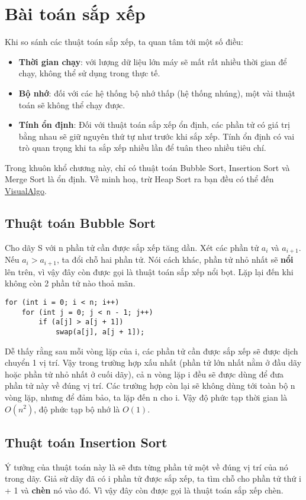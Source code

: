 \chapter{Bài toán sắp xếp}
Khi so sánh các thuật toán sắp xếp, ta quan tâm tới một số điều:
\begin{itemize}
    \item \textbf{Thời gian chạy}: với lượng dữ liệu lớn máy sẽ mất rất nhiều thời gian để chạy, không thể sử dụng trong thực tế.
    \item \textbf{Bộ nhớ}: đối với các hệ thống bộ nhớ thấp (hệ thống nhúng), một vài thuật toán sẽ không thể chạy được.
    \item \textbf{Tính ổn định}: Đối với thuật toán sắp xếp ổn định, các phần tử có giá trị bằng nhau sẽ giữ nguyên thứ tự như trước khi sắp xếp. Tính ổn định có vai trò quan trọng khi ta sắp xếp nhiều lần để tuân theo nhiều tiêu chí.
\end{itemize}
Trong khuôn khổ chương này, chỉ có thuật toán Bubble Sort, Insertion Sort và Merge Sort là ổn định. Về minh hoạ, trừ Heap Sort ra bạn đều có thể đến \href{https://visualgo.net/en/sorting}{VisualAlgo}.

\section{Thuật toán Bubble Sort}
Cho dãy S với n phần tử cần được sắp xếp tăng dần. Xét các phần tử $a_i$ và $a_{i+1}$. Nếu $a_i>a_{i+1}$, ta đổi chỗ hai phần tử. Nói cách khác, phần tử nhỏ nhất sẽ \textbf{nổi} lên trên, vì vậy đây còn được gọi là thuật toán sắp xếp nổi bọt. Lặp lại đến khi không còn 2 phần tử nào thoả mãn.

\begin{verbatim}
for (int i = 0; i < n; i++)
    for (int j = 0; j < n - 1; j++)
        if (a[j] > a[j + 1])
            swap(a[j], a[j + 1]);
\end{verbatim}

Dễ thấy rằng sau mỗi vòng lặp của i, các phần tử cần được sắp xếp sẽ được dịch chuyển 1 vị trí. Vậy trong trường hợp xấu nhất (phần tử lớn nhất nằm ở đầu dãy hoặc phần tử nhỏ nhất ở cuối dãy), cả n vòng lặp i đều sẽ được dùng để đưa phần tử này về đúng vị trí. Các trường hợp còn lại sẽ không dùng tới toàn bộ n vòng lặp, nhưng để đảm bảo, ta lặp đến n cho i. Vậy độ phức tạp thời gian là $O(n^2)$, độ phức tạp bộ nhớ là $O(1)$.
\section{Thuật toán Insertion Sort}
Ý tưởng của thuật toán này là sẽ đưa từng phần tử một về đúng vị trí của nó trong dãy. Giả sử dãy đã có i phần tử được sắp xếp, ta tìm chỗ cho phần tử thứ i + 1 và \textbf{chèn} nó vào đó. Vì vậy đây còn được gọi là thuật toán sắp xếp chèn.

